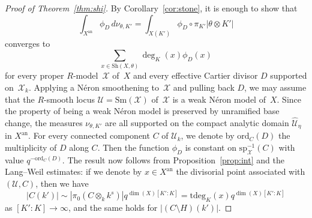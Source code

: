 \documentclass[JEP,XML,SOM,Unicode,NoFloatCountersInSection]{cedram}
\theoremstyle{definition}
\numberwithin{equation}{subsection}
\newcommand{\cX}{\ensuremath{\mathscr{X}}}
\newcommand{\cU}{\ensuremath{\mathscr{U}}}
\newcommand{\an}{\mathrm{an}}
\newcommand{\ord}{\mathrm{ord}}
\newcommand{\Sh}{\mathrm{Sh}}
\newcommand{\Sm}{\mathrm{Sm}}
\newcommand{\spe}{\mathrm{sp}}
\newcommand{\tdeg}{\mathrm{tdeg}}
\let\form\theta
\begin{document}
\begin{proof}[Proof of Theorem~\ref{thm:shi}]
By Corollary~\ref{cor:stone}, it is enough to show that
\[
\int_{X^{\an}}\phi_D\, d\nu_{\form,K'}=\int_{X(K')}\phi_D\circ \pi_{K'}|\form\otimes K'|
\]
converges to
\[
\sum_{x\in \Sh(X,\form)}\deg_K(x)\phi_D(x)
\]
for
every proper $R$\nobreakdash-model~$\cX$ of~$X$ and every effective Cartier divisor $D$ supported on~$\cX_k$.
Applying a Néron smoothening to~$\cX$ and pulling back $D$, we may assume that the $R$\nobreakdash-smooth locus $\cU=\Sm(\cX)$ of~$\cX$ is a weak Néron model of~$X$.
Since the property of being a weak Néron model is preserved by unramified base change, the measures $\nu_{\form,K'}$ are all supported on the compact analytic domain $\widehat{\cU}_{\eta}$ in $X^{\an}$. For every connected component $C$ of $\cU_k$, we denote by $\ord_C(D)$ the multiplicity of $D$ along $C$. Then
the function $\phi_D$ is constant on $\spe_{\cX}^{-1}(C)$ with value $q^{-\ord_C(D)}$. The result now follows from Proposition~\ref{prop:int} and the Lang--Weil estimates:
if we denote by $x\in X^{\an}$ the divisorial point associated with $(\cU,C)$, then
we have
\begin{equation*}
|C(k')|
\sim |\pi_0(C\otimes_k k^s)|q^{\dim(X)[K'\colon K]}
= \tdeg_K(x)q^{\dim(X)[K'\colon K]}
\end{equation*}
as $[K':K]\to\infty$, and the same holds for $|(C\setminus H)(k')|$.
\end{proof}
\end{document}

